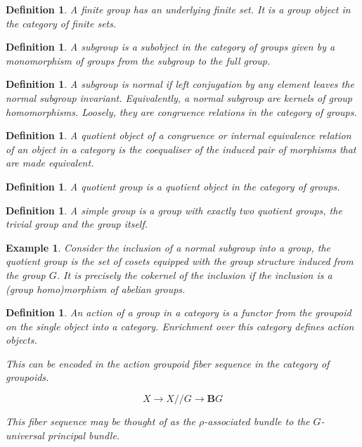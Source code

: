 \documentclass{tufte-book}
\newtheorem{definition}[theorem]{Definition}
\newtheorem{example}[theorem]{Example}
\begin{document}
\begin{definition}
  A finite group has an underlying finite set. It is a group object in the category of finite sets.
\end{definition}

\begin{definition}
  A subgroup is a subobject in the category of groups given by a monomorphism of groups from the subgroup to the full group.
\end{definition}

\begin{definition}
  A subgroup is normal if left conjugation by any element leaves the normal subgroup invariant. Equivalently, a normal subgroup are kernels of group homomorphisms. Loosely, they are congruence relations in the category of groups.
\end{definition}

\begin{definition}
  A quotient object of a congruence or internal equivalence relation of an object in a category is the coequaliser of the induced pair of morphisms that are made equivalent.
\end{definition}

\begin{definition}
  A quotient group is a quotient object in the category of groups.
\end{definition}

\begin{definition}
  A simple group is a group with exactly two quotient groups, the trivial group and the group itself.
\end{definition}

\begin{example}
  Consider the inclusion of a normal subgroup into a group, the quotient group is the set of cosets equipped with the group structure induced from the group $G$. It is precisely the cokernel of the inclusion if the inclusion is a (group homo)morphism of abelian groups.
\end{example}

\begin{definition}
  An action of a group in a category is a functor from the groupoid on the single object into a category.
  Enrichment over this category defines action objects.

  This can be encoded in the action groupoid fiber sequence in the category of groupoids.

  \begin{equation}
    X \rightarrow X // G \rightarrow \mathbf{B}G
  \end{equation}

  This fiber sequence may be thought of as the $\rho$-associated bundle to the $G$-universal principal bundle.
\end{definition}
\end{document}
